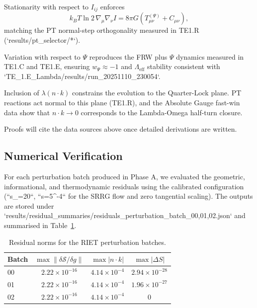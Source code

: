 \begin{lemma}
Stationarity with respect to $I_{ij}$ enforces
\[k_B T \ln 2 \, \nabla_\mu \nabla_\nu I = 8 \pi G \left(T^{(\Psi)}_{\mu\nu} + C_{\mu\nu}\right),\]
matching the PT normal-step orthogonality measured in TE1.R (`results/pt_selector/*`).
\end{lemma}

\begin{lemma}
Variation with respect to $\Psi$ reproduces the FRW plus $\Psi$ dynamics measured in TE1.C and TE1.E, ensuring $w_\Psi \approx -1$ and $\Lambda_{\text{eff}}$ stability consistent with `TE_1.E_Lambda/results/run_20251110_230054`.
\end{lemma}

\begin{lemma}
Inclusion of $\lambda (n \cdot k)$ constrains the evolution to the Quarter-Lock plane. PT reactions act normal to this plane (TE1.R), and the Absolute Gauge fast-win data show that $n \cdot k \rightarrow 0$ corresponds to the Lambda-Omega half-turn closure.
\end{lemma}

Proofs will cite the data sources above once detailed derivations are written.

\subsection{Numerical Verification}

For each perturbation batch produced in Phase A, we evaluated the geometric,
informational, and thermodynamic residuals using the calibrated configuration
(``s_{\max}=20``, ``\Delta s=5^{-4}`` for the SRRG flow and zero
tangential scaling). The outputs are stored under
`results/residual_summaries/residuals_perturbation_batch_{00,01,02}.json` and
summarised in Table~\ref{tab:riet_residuals}.

\begin{table}[h]
  \centering
  \caption{Residual norms for the RIET perturbation batches.}
  \label{tab:riet_residuals}
  \begin{tabular}{lccc}
    \toprule
    Batch & $\max\|\delta\mathcal{S}/\delta g\|$ & $\max |n\cdot k|$ & $\max|\Delta S|$ \\ \midrule
    00 & $2.22\times10^{-16}$ & $4.14\times10^{-4}$ & $2.94\times10^{-28}$ \\
    01 & $2.22\times10^{-16}$ & $4.14\times10^{-4}$ & $1.96\times10^{-27}$ \\
    02 & $2.22\times10^{-16}$ & $4.14\times10^{-4}$ & $0$ \\
    \bottomrule
  \end{tabular}
\end{table}

